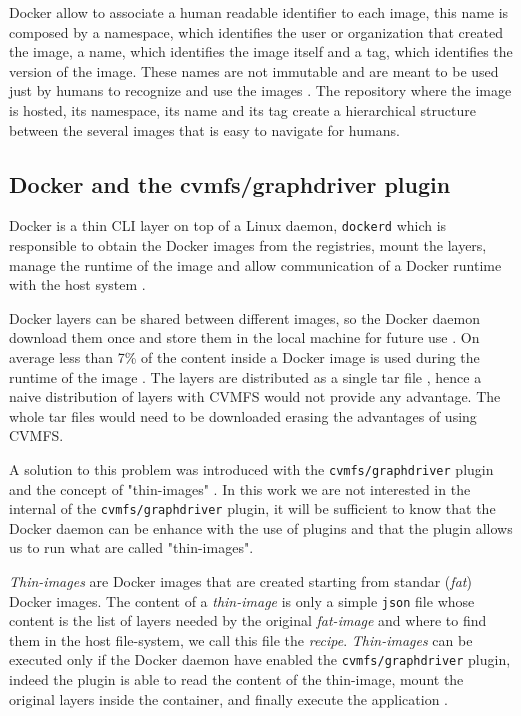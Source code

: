 Docker allow to associate a human readable identifier to each image, this name
is composed by a namespace, which identifies the user or organization that created
the image, a name, which identifies the image itself and a tag, which identifies
the version of the image. These names are not immutable and are meant to be
used just by humans to recognize and use the images \cite{docker:tag}.
The repository where the image is hosted, its namespace, its name and its tag
create a hierarchical structure between the several images that is easy to
navigate for humans.

\subsection{Docker and the cvmfs/graphdriver plugin}
\label{subsec:docker-thin-images}

Docker is a thin CLI layer on top of a Linux daemon, \texttt{dockerd} which is
responsible to obtain the Docker images from the registries, mount the layers,
manage the runtime of the image and allow communication of a Docker runtime
with the host system \cite{docker:overview}.

Docker layers can be shared between different images, so the Docker daemon
download them once and store them in the local machine for future use
\cite{docker:storage}. On average less than 7\% of the content inside a Docker
image is used during the runtime of the image \cite{slacker}. The layers are
distributed as a single tar file \cite{oci:image-filesystem}, hence a naive
distribution of layers with CVMFS would not provide any advantage. The whole
tar files would need to be downloaded erasing the advantages of using CVMFS.

A solution to this problem was introduced with the \texttt{cvmfs/graphdriver}
plugin and the concept of "thin-images" \cite{graphdriver-plugin}. In this work
we are not interested in the internal of the \texttt{cvmfs/graphdriver} plugin,
it will be sufficient to know that the Docker daemon can be enhance with the
use of plugins \cite{docker:plugin} and that the plugin allows us to run what
are called "thin-images".

\textit{Thin-images} are Docker images that are created starting from standar
(\textit{fat}) Docker images. The content of a \textit{thin-image} is only a simple
\texttt{json} file whose content is the list of layers needed by the original
\textit{fat-image} and where to find them in the host file-system, we call this file
the \textit{recipe}. \textit{Thin-images} can be executed only if the Docker daemon have
enabled the \texttt{cvmfs/graphdriver} plugin, indeed the plugin is able to read
the content of the thin-image, mount the original layers inside the container,
and finally execute the application \cite{graphdriver-plugin}.

